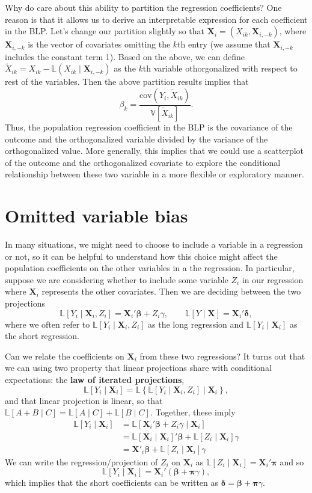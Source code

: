 \documentclass[
  letterpaper,
  DIV=11,
  numbers=noendperiod]{scrreprt}
\newcommand{\mb}{\symbf}
\newcommand{\V}{\mathbb{V}}
\newcommand{\cov}{\text{cov}}
\newcommand{\bbL}{\mathbb{L}}
\newcommand{\X}{\mb{X}}
\newcommand{\bfbeta}{\mb{\beta}}
\theoremstyle{definition}
\theoremstyle{plain}
\theoremstyle{definition}
\theoremstyle{remark}
\begin{document}
Why do care about this ability to partition the regression coefficients?
One reason is that it allows us to derive an interpretable expression
for each coefficient in the BLP. Let's change our partition slightly so
that \(\X_i = (X_{{ik}}, \X_{i,-k})\), where \(\X_{i,-k}\) is the vector
of covariates omitting the \(k\)th entry (we assume that \(\X_{i,-k}\)
includes the constant term 1). Based on the above, we can define
\(\widetilde{X}_{ik} = X_{ik} - \bbL(X_{ik}\mid \X_{i,-k})\) as the
\(k\)th variable othorgonalized with respect to rest of the variables.
Then the above partition results implies that \[ 
\beta_k = \frac{\cov(Y_i, \widetilde{X}_{ik})}{\V[\widetilde{X}_{ik}]}.
\] Thus, the population regression coefficient in the BLP is the
covariance of the outcome and the orthogonalized variable divided by the
variance of the orthogonalized value. More generally, this implies that
we could use a scatterplot of the outcome and the orthogonalized
covariate to explore the conditional relationship between these two
variable in a more flexible or exploratory manner.

\hypertarget{omitted-variable-bias}{%
\section{Omitted variable bias}\label{omitted-variable-bias}}

In many situations, we might need to choose to include a variable in a
regression or not, so it can be helpful to understand how this choice
might affect the population coefficients on the other variables in a the
regression. In particular, suppose we are considering whether to include
some variable \(Z_i\) in our regression where \(\X_i\) represents the
other covariates. Then we are deciding between the two projections \[ 
\bbL[Y_i \mid \X_i, Z_i] = \X_i'\bfbeta + Z_i\gamma, \qquad \bbL[Y \mid \X] = \X_i'\mb{\delta},
\] where we often refer to \(\bbL[Y_i \mid \X_i, Z_i]\) as the long
regression and \(\bbL[Y_i \mid \X_i]\) as the short regression.

Can we relate the coefficients on \(\X_i\) from these two regressions?
It turns out that we can using two property that linear projections
share with conditional expectations: the \textbf{law of iterated
projections}, \[
\bbL[Y_i \mid \X_i] = \bbL\left\{ \bbL[Y_i \mid \X_i, Z_i] \mid \X_i \right\},
\] and that linear projection is linear, so that
\(\bbL[A + B \mid C] = \bbL[A\mid C] + \bbL[B \mid C]\). Together, these
imply \[  
\begin{aligned}
 \bbL[Y_i \mid \X_i] &= \bbL[\X_i'\bfbeta + Z_i\gamma \mid \X_i] \\
 &= \bbL[\X_i\mid \X_i]'\bfbeta + \bbL[Z_i \mid \X_i]\gamma \\
 &= \X'_i\bfbeta + \bbL[Z_i \mid \X_i]\gamma
 \end{aligned}
\] We can write the regression/projection of \(Z_i\) on \(\X_i\) as
\(\bbL[Z_i \mid \X_i]= \X_i'\mb{\pi}\) and so \[ 
\bbL[Y_i \mid \X_i] = \X_i'(\bfbeta + \mb{\pi}\gamma), 
\] which implies that the short coefficients can be written as
\(\mb{\delta} = \bfbeta + \mb{\pi}\gamma\).
\end{document}
